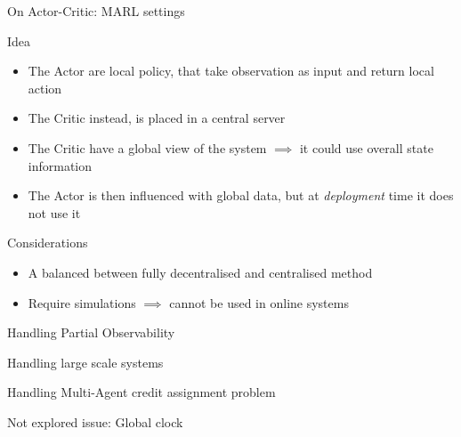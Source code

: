 \documentclass[presentation]{beamer}\mode<presentation>{\usetheme{AMSBolognaFC}}
\begin{document}
\begin{frame}{On Actor-Critic: MARL settings}
	\begin{alertblock}{Idea}
		\begin{itemize}
			\item The Actor are local policy, that take observation as input and return local action
			\item The Critic instead, is placed in a central server
			\item The Critic have a global view of the system $\implies$ it could use overall state information 
			\item The Actor is then influenced with global data, but at \emph{deployment} time it does not use it
		\end{itemize}
	\end{alertblock}
	\begin{exampleblock}{Considerations}
		\begin{itemize}
			\item[{\color{teal} \faThumbsUp}] A balanced between fully decentralised and centralised method
			\item[{\color{red} \faThumbsDown}] Require simulations $\implies$ cannot be used in online systems  
		\end{itemize}
	\end{exampleblock}
\end{frame}

\begin{frame}{Handling Partial Observability}

\end{frame}

\begin{frame}{Handling large scale systems}

\end{frame}

\begin{frame}{Handling Multi-Agent credit assignment problem}

\end{frame}

\begin{frame}{Not explored issue: Global clock}

\end{frame}

\end{document}

